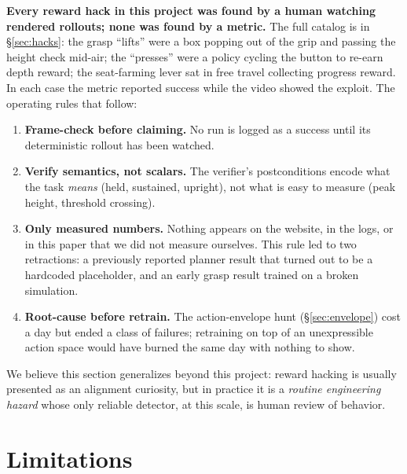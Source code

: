 \documentclass[11pt]{article}
\begin{document}
\textbf{Every reward hack in this project was found by a human watching rendered rollouts; none was found by a metric.} The full catalog is in \S\ref{sec:hacks}: the grasp ``lifts'' were a box popping out of the grip and passing the height check mid-air; the ``presses'' were a policy cycling the button to re-earn depth reward; the seat-farming lever sat in free travel collecting progress reward. In each case the metric reported success while the video showed the exploit. The operating rules that follow:
\begin{enumerate}[nosep]
  \item \textbf{Frame-check before claiming.} No run is logged as a success until its deterministic rollout has been watched.
  \item \textbf{Verify semantics, not scalars.} The verifier's postconditions encode what the task \emph{means} (held, sustained, upright), not what is easy to measure (peak height, threshold crossing).
  \item \textbf{Only measured numbers.} Nothing appears on the website, in the logs, or in this paper that we did not measure ourselves. This rule led to two retractions: a previously reported planner result that turned out to be a hardcoded placeholder, and an early grasp result trained on a broken simulation.
  \item \textbf{Root-cause before retrain.} The action-envelope hunt (\S\ref{sec:envelope}) cost a day but ended a class of failures; retraining on top of an unexpressible action space would have burned the same day with nothing to show.
\end{enumerate}

We believe this section generalizes beyond this project: reward hacking is usually presented as an alignment curiosity, but in practice it is a \emph{routine engineering hazard} whose only reliable detector, at this scale, is human review of behavior.

\section{Limitations}
\end{document}
